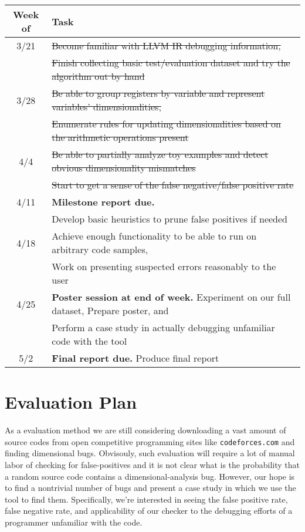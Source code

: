\documentclass[12pt]{article}
\begin{document}
\noindent
\begin{tabular}{c | l}
Week of & Task \\
\hline
3/21 & \sout{Become familiar with LLVM IR debugging information,} \\
& \sout{Finish collecting basic test/evaluation dataset and try the algorithm out by hand} \\
3/28 & \sout{Be able to group registers by variable and represent variables' dimensionalities,} \\
& \sout{Enumerate rules for updating dimensionalities based on the arithmetic operations present} \\
4/4 & \sout{Be able to partially analyze toy examples and detect obvious dimensionality mismatches} \\
& \sout{Start to get a sense of the false negative/false positive rate} \\
4/11 & \textbf{Milestone report due.} \\
& Develop basic heuristics to prune false positives if needed \\
4/18 & Achieve enough functionality to be able to run on arbitrary code samples, \\
& Work on presenting suspected errors reasonably to the user \\
4/25 & \textbf{Poster session at end of week.} Experiment on our full dataset, Prepare poster, and \\
& Perform a case study in actually debugging unfamiliar code with the tool \\
5/2 & \textbf{Final report due.} Produce final report
\end{tabular}

\section{Evaluation Plan}

As a evaluation method we are still considering downloading a vast amount of source codes from open competitive programming sites like \texttt{codeforces.com} and finding dimensional bugs.
Obvisouly, such evaluation will require a lot of manual labor of checking for false-positives and it is not clear what is the probability that a random source code contains a dimensional-analysis bug. However, our hope is to find a nontrivial number of bugs and present a case study in which we use the tool to find them.
Specifically, we're interested in seeing the false positive rate, false negative rate, and applicability of our checker to the debugging efforts of a programmer unfamiliar with the code.
\end{document}
